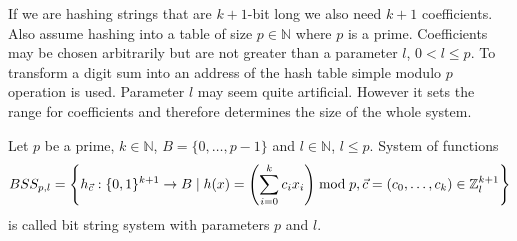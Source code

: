 If we are hashing strings that are $k + 1$-bit long we also need $k + 1$ coefficients. Also assume hashing into a table of size $p \in \mathbb{N}$ where $p$ is a prime. Coefficients may be chosen arbitrarily but are not greater than a parameter $l$, $0 < l \leq p$. To transform a digit sum into an address of the hash table simple modulo $p$ operation is used. Parameter $l$ may seem quite artificial. However it sets the range for coefficients and therefore determines the size of the whole system.

\begin{definition}
Let $p$ be a prime, $k \in \mathbb{N}$, $B = \{0, \dots, p - 1 \}$ and $l \in \mathbb{N}$, $l \leq p$. System of functions
\begin{displaymath}
BSS_{p, l} = \left\{ h_{\vec{c}}: \{0, 1\}^{k + 1} \rightarrow B \mid h(x) = \left(\displaystyle \sum_{i=0}^{k} c_i x_i\right) \bmod p, \vec{c} = (c_0, \dots, c_k)  \in \mathbb{Z}_l^{k + 1} \right\}
\end{displaymath} 
is called bit string system with parameters $p$ and $l$.
\end{definition}

